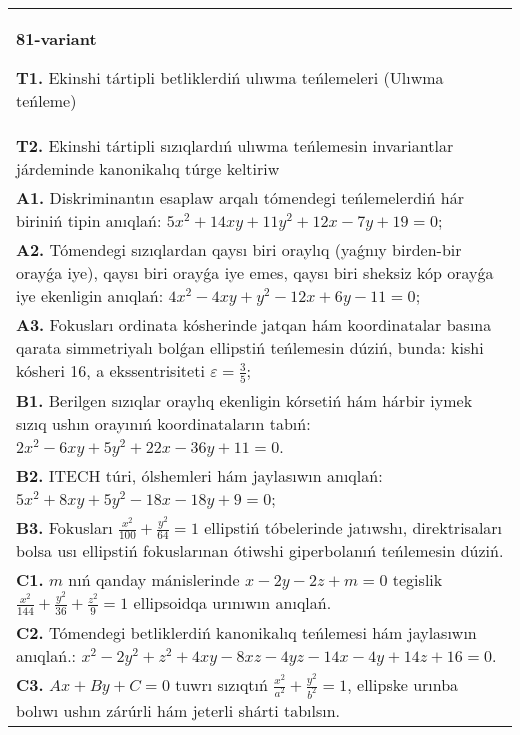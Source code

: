 \documentclass{article}
\begin{document}
\begin{tabular}{m{17cm}}
\textbf{81-variant}
\newline

\textbf{T1.} Ekinshi tártipli betliklerdiń ulıwma teńlemeleri (Ulıwma teńleme) \\
\textbf{T2.} Ekinshi tártipli sızıqlardıń ulıwma teńlemesin invariantlar járdeminde kanonikalıq túrge keltiriw \\
\textbf{A1.} Diskriminantın esaplaw arqalı tómendegi teńlemelerdiń hár biriniń tipin anıqlań: $5 x^2+14 x y+11 y^2+12 x-7 y+19=0$; \\
\textbf{A2.} Tómendegi sızıqlardan qaysı biri oraylıq (yaǵnıy birden-bir orayǵa iye), qaysı biri orayǵa iye emes, qaysı biri sheksiz kóp orayǵa iye ekenligin anıqlań: $4 x^2-4 x y+y^2-12 x+6 y-11=0$; \\
\textbf{A3.} Fokusları ordinata kósherinde jatqan hám koordinatalar basına qarata simmetriyalı bolǵan ellipstiń teńlemesin dúziń, bunda: kishi kósheri 16, a ekssentrisiteti $\varepsilon=\frac{3}{5}$; \\
\textbf{B1.} Berilgen sızıqlar oraylıq ekenligin kórsetiń hám hárbir iymek sızıq ushın orayınıń koordinataların tabıń: $2 x^2-6 x y+5 y^2+22 x-36 y+11=0$. \\
\textbf{B2.} ITECH túri, ólshemleri hám jaylasıwın anıqlań: $5 x^2+8 x y+5 y^2-18 x-18 y+9=0$; \\
\textbf{B3.} Fokusları $\frac{x^2}{100}+\frac{y^2}{64}=1$ ellipstiń tóbelerinde jatıwshı, direktrisaları bolsa usı ellipstiń fokuslarınan ótiwshi giperbolanıń teńlemesin dúziń. \\
\textbf{C1.} $m$ nıń qanday mánislerinde $x-2 y-2 z+m=0$ tegislik $\frac{x^2}{144}+\frac{y^2}{36}+\frac{z^2}{9}=1$ ellipsoidqa urınıwın anıqlań. \\
\textbf{C2.} Tómendegi betliklerdiń kanonikalıq teńlemesi hám jaylasıwın anıqlań.: $x^2-2 y^2+z^2+4 x y-8 x z-4 y z-14 x-4 y+14 z+16=0$. \\
\textbf{C3.} $A x+B y+C=0$ tuwrı sızıqtıń $\frac{x^2}{a^2}+\frac{y^2}{b^2}=1$, ellipske urınba bolıwı ushın zárúrli hám jeterli shárti tabılsın. \\

\end{tabular}
\vspace{1cm}
\end{document}
